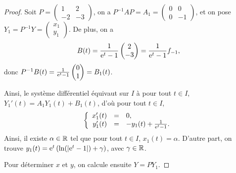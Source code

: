 \documentclass[12pt]{article}
\begin{document}
\begin{proof}
	Soit $P=\begin{pmatrix}
		1&2\\
		-2&-3
	\end{pmatrix}$, on a $P^{-1}AP=A_1=\begin{pmatrix}
		0&0\\
		0&-1
	\end{pmatrix}$, et on pose $Y_1=P^{-1}Y=\begin{pmatrix}
		x_1\\y_1
	\end{pmatrix}$. De plus, on a 
	\begin{equation*}
		B(t)=\frac{1}{\mathrm{e}^{t}-1}\begin{pmatrix}
			2\\-3
		\end{pmatrix}=\frac{1}{\mathrm{e}^{t}-1}f_{-1},
	\end{equation*}
	donc $P^{-1}B(t)=\frac{1}{\mathrm{e}^{t}-1}\begin{pmatrix}
		0\\1
	\end{pmatrix}=B_1(t)$.

	Ainsi, le système différentiel équivaut sur $I$ à pour tout $t\in I$, $Y_1'(t)=A_1 Y_1(t)+B_1(t)$, d'où pour tout $t\in I$,
	\begin{equation*}
		\left\lbrace
			\begin{array}[]{rcl}
				x_1'(t)&=&0,\\
				y_1'(t)&=&-y_1(t)+\frac{1}{\e^{t}-1}.
			\end{array}
		\right.
	\end{equation*}
	Ainsi, il existe $\alpha\in\mathbb{R}$ tel que pour tout $t\in I$, $x_1(t)=\alpha$. D'autre part, on trouve $y_1(t)=\mathrm{e}^{t}\left(\ln(\left\lvert\mathrm{e}^{t}-1\right\rvert)+\gamma\right)$, avec $\gamma\in\mathbb{R}$.

	Pour déterminer $x$ et $y$, on calcule ensuite $Y=PY_{1}$.
\end{proof}
\end{document}
